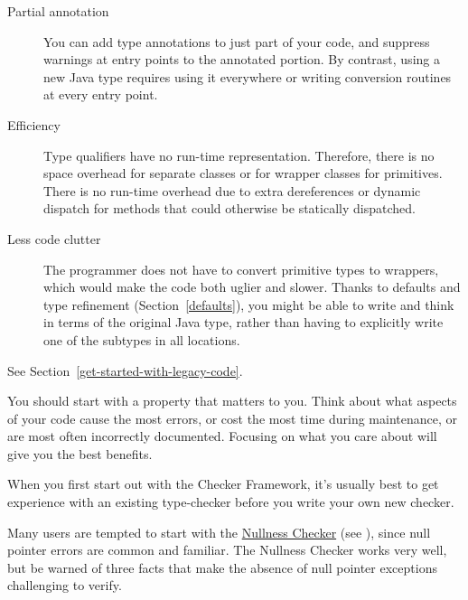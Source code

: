\begin{description}
\item[Partial annotation]
  You can add type annotations to just part of your code, and suppress
  warnings at entry points to the annotated portion.  By contrast, using a
  new Java type requires using it everywhere or writing conversion routines
  at every entry point.

\item[Efficiency]
  Type qualifiers have no run-time representation.  Therefore, there is no
  space overhead for separate classes or for wrapper classes for
  primitives.  There is no run-time overhead due to extra dereferences
  or dynamic dispatch for methods that could otherwise be statically
  dispatched.

\item[Less code clutter]
  The programmer does not have to convert primitive types to wrappers,
  which would make the code both uglier and slower.  Thanks to defaults and
  type refinement (Section~\ref{defaults}),
  you might be able to write and think in terms of the
  original Java type, rather than having to explicitly write one of the
  subtypes in all locations.

\end{description}






See Section~\ref{get-started-with-legacy-code}.



You should start with a property that matters to you.  Think about what
aspects of your code cause the most errors, or cost the most time during
maintenance, or are most often incorrectly documented.  Focusing
on what you care about will give you the best benefits.

When you first start out with the Checker Framework, it's usually best to
get experience with an existing type-checker before you write your own new
checker.

Many users are tempted to start with the
\hyperref[nullness-checker]{Nullness Checker} (see
), since null pointer errors are common
and familiar.  The Nullness Checker works very well, but be warned of three
facts that make the absence of null pointer exceptions challenging to
verify.

